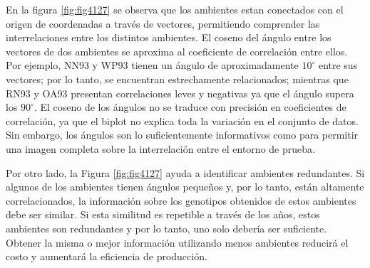 \begin{itemize}[wide, nosep, labelindent = 0pt,  noitemsep, topsep=0pt]
En la figura \ref{fig:fig4127} se observa que los ambientes estan conectados con el origen de coordenadas a través de vectores, permitiendo comprender las interrelaciones entre los distintos ambientes. El coseno del ángulo entre los vectores de dos ambientes se aproxima al coeficiente de correlación entre ellos. Por ejemplo, NN93 y WP93 tienen un ángulo de aproximadamente $10^{\circ}$ entre sus vectores; por lo tanto, se encuentran estrechamente relacionados; mientras que RN93 y OA93 presentan correlaciones leves y negativas ya que el ángulo supera los $90^{\circ}$. El coseno de los ángulos no se traduce con precisión en coeficientes de correlación, ya que el biplot no explica toda la variación en el conjunto de datos. Sin embargo, los ángulos son lo suficientemente informativos como para permitir una imagen completa sobre la interrelación entre el entorno de prueba.

Por otro lado, la Figura \ref{fig:fig4127} ayuda a identificar ambientes redundantes. Si algunos de los ambientes tienen ángulos pequeños y, por lo tanto, están altamente correlacionados, la información sobre los genotipos obtenidos de estos ambientes debe ser similar. Si esta similitud es repetible a través de los años, estos ambientes son redundantes y por lo tanto, uno solo debería ser suficiente. Obtener la misma o mejor información utilizando menos ambientes reducirá el costo y aumentará la eficiencia de producción.



\end{itemize}
